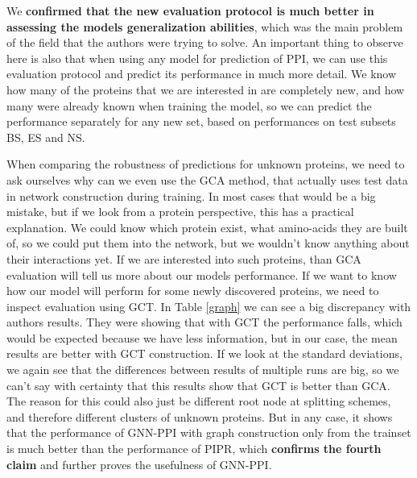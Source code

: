 We \textbf{confirmed that the new evaluation protocol is much better in assessing the models generalization abilities}, which was the main problem of the field that the authors were trying to solve. 
An important thing to observe here is also that when using any model for prediction of PPI, we can use this evaluation protocol and predict its performance in much more detail. We know how many of the proteins that we are interested in are completely new, and how many were already known when training the model, so we can predict the performance separately for any new set, based on performances on test subsets BS, ES and NS.

When comparing the robustness of predictions for unknown proteins, we need to ask ourselves why can we even use the GCA method, that actually uses test data in network construction during training. In most cases that would be a big mistake, but if we look from a protein perspective, this has a practical explanation. We could know which protein exist, what amino-acids they are built of, so we could put them into the network, but we wouldn't know anything about their interactions yet. If we are interested into such proteins, than GCA evaluation will tell us more about our models performance. If we want to know how our model will perform for some newly discovered proteins, we need to inspect evaluation using GCT.
In Table \ref{graph} we can see a big discrepancy with authors results. They were showing that with GCT the performance falls, which would be expected because we have less information, but in our case, the mean results are better with GCT construction. If we look at the standard deviations, we again see that the differences between results of multiple runs are big, so we can't say with certainty that this results show that GCT is better than GCA. The reason for this could also just be different root node at splitting schemes, and therefore different clusters of unknown proteins. But in any case, it shows that the performance of GNN-PPI with graph construction only from the trainset is much better than the performance of PIPR, which \textbf{confirms the fourth claim} and further proves the usefulness of GNN-PPI.

